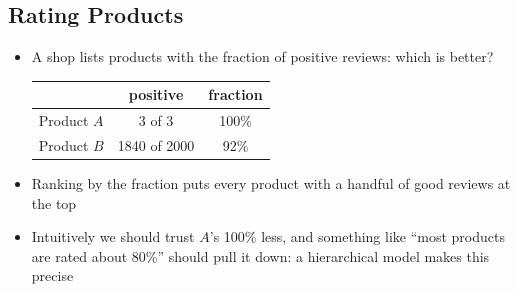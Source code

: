 \Outline %

\begin{slide}
\section{Rating Products}

\begin{PauseHighLight}
  \begin{itemize}
  \item A shop lists products with the fraction of positive
    reviews: which is better?\pause
    \begin{center}
      \begin{tabular}{l|cc}
        & positive & fraction \\ \hline
        Product $A$ & 3 of 3 & 100\% \\
        Product $B$ & 1840 of 2000 & 92\%
      \end{tabular}
    \end{center}\pause
  \item Ranking by the fraction puts every product with a handful of
    good reviews at the top\pause
  \item Intuitively we should trust $A$'s 100\% less\pause{}, and
    something like ``most products are rated about 80\%'' should pull
    it down\pauseb{}: a hierarchical model makes this precise\pauseb
  \end{itemize}
\end{PauseHighLight}

\end{slide}


